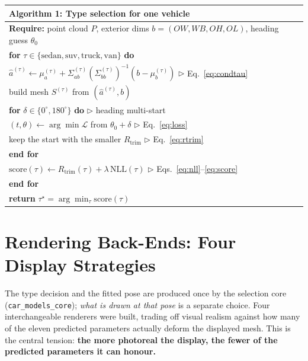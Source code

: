 \documentclass[11pt]{article}
\newcommand{\OL}{\mathit{OL}}
\newcommand{\OW}{\mathit{OW}}
\newcommand{\OH}{\mathit{OH}}
\newcommand{\WB}{\mathit{WB}}
\newcommand{\Rtrim}{R_{\text{trim}}}
\newcommand{\NLL}{\text{NLL}}
\theoremstyle{definition}
\begin{document}
\begin{table}[h]
\centering
\begin{tabular}{p{}}
\toprule
\textbf{Algorithm 1:} Type selection for one vehicle \\
\midrule
\textbf{Require:} point cloud $P$, exterior dims $b=(\OW,\WB,\OH,\OL)$, heading guess $\theta_0$ \\[2pt]
\textbf{for} $\tau \in \{\text{sedan},\text{suv},\text{truck},\text{van}\}$ \textbf{do} \\
\quad $\hat{a}^{(\tau)} \leftarrow \mu_a^{(\tau)} + \Sigma_{ab}^{(\tau)}(\Sigma_{bb}^{(\tau)})^{-1}(b-\mu_b^{(\tau)})$ \hfill $\triangleright$ Eq.~\eqref{eq:condtau} \\
\quad build mesh $S^{(\tau)}$ from $(\hat{a}^{(\tau)}, b)$ \\
\quad \textbf{for} $\delta \in \{0^\circ, 180^\circ\}$ \textbf{do} \hfill $\triangleright$ heading multi-start \\
\quad\quad $(t,\theta) \leftarrow \arg\min \mathcal{L}$ from $\theta_0 + \delta$ \hfill $\triangleright$ Eq.~\eqref{eq:loss} \\
\quad\quad keep the start with the smaller $\Rtrim$ \hfill $\triangleright$ Eq.~\eqref{eq:rtrim} \\
\quad \textbf{end for} \\
\quad $\text{score}(\tau) \leftarrow \Rtrim(\tau) + \lambda\,\NLL(\tau)$ \hfill $\triangleright$ Eqs.~\eqref{eq:nll}--\eqref{eq:score} \\
\textbf{end for} \\
\textbf{return} $\tau^\star = \arg\min_\tau \text{score}(\tau)$ \\
\bottomrule
\end{tabular}
\end{table}

\section{Rendering Back-Ends: Four Display Strategies}

The type decision and the fitted pose are produced once by the selection core
(\texttt{car\_models\_core}); \emph{what is drawn at that pose} is a separate
choice. Four interchangeable renderers were built, trading off visual realism
against how many of the eleven predicted parameters actually deform the displayed
mesh. This is the central tension: \textbf{the more photoreal the display, the
fewer of the predicted parameters it can honour.}
\end{document}
